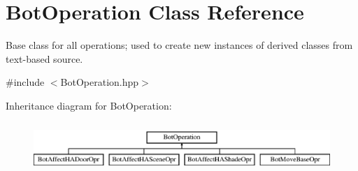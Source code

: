 \hypertarget{classBotOperation}{\section{Bot\-Operation Class Reference}
\label{classBotOperation}
}


Base class for all operations; used to create new instances of derived classes from text-\/based source.  




{\ttfamily \#include $<$Bot\-Operation.\-hpp$>$}

Inheritance diagram for Bot\-Operation\-:\begin{figure}[H]
\begin{center}
\leavevmode
\includegraphics[height=1.891892cm]{classBotOperation}
\end{center}
\end{figure}
